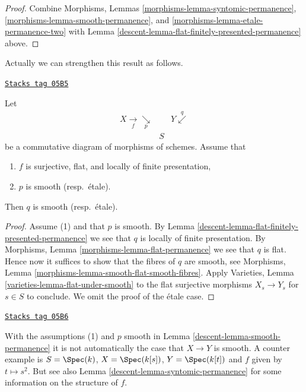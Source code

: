 \begin{proof}

Combine Morphisms, Lemmas
\ref{morphisms-lemma-syntomic-permanence},
\ref{morphisms-lemma-smooth-permanence}, and
\ref{morphisms-lemma-etale-permanence-two}
with Lemma \ref{descent-lemma-flat-finitely-presented-permanence} above.
\end{proof}

Actually we can strengthen this result as follows.

\begin{lemma}
\label{descent-lemma-smooth-permanence}
\href{https://stacks.math.columbia.edu/tag/05B5}{\texttt{Stacks tag 05B5}}

Let
$$
\begin{array}{ccc}X \underset{f}{\longrightarrow}\underset{p}{\searrow} &  & Y \overset{q}{\swarrow} \\  & S & \end{array}
$$
be a commutative diagram of morphisms of schemes. Assume that
\begin{enumerate}
\item $f$ is surjective, flat, and locally of finite presentation,
\item $p$ is smooth (resp.\ \'etale).
\end{enumerate}
Then $q$ is smooth (resp.\ \'etale).
\end{lemma}

\begin{proof}

Assume (1) and that $p$ is smooth. By
Lemma \ref{descent-lemma-flat-finitely-presented-permanence}
we see that $q$ is locally of finite presentation.
By
Morphisms, Lemma \ref{morphisms-lemma-flat-permanence}
we see that $q$ is flat.
Hence now it suffices to show that the fibres of $q$ are smooth, see
Morphisms, Lemma \ref{morphisms-lemma-smooth-flat-smooth-fibres}.
Apply
Varieties, Lemma \ref{varieties-lemma-flat-under-smooth}
to the flat surjective morphisms $X_s \to Y_s$ for $s \in S$ to
conclude. We omit the proof of the \'etale case.
\end{proof}

\begin{remark}
\label{descent-remark-smooth-permanence}
\href{https://stacks.math.columbia.edu/tag/05B6}{\texttt{Stacks tag 05B6}}

With the assumptions (1) and $p$ smooth in
Lemma \ref{descent-lemma-smooth-permanence}
it is not automatically the case that $X \to Y$ is smooth.
A counter example is $S = \Spec(k)$, $X = \Spec(k[s])$,
$Y = \Spec(k[t])$ and $f$ given by $t \mapsto s^2$.
But see also Lemma \ref{descent-lemma-syntomic-permanence}
for some information on the structure of $f$.
\end{remark}

